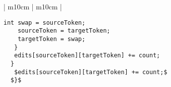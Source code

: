 \begin{landscape}
\begin{table}[p]
\begin{tabular}{ | m{10cm} | m{10cm} | }
{\begin{lstlisting}[style=table]
    int swap = sourceToken;
    sourceToken = targetToken;
    targetToken = swap;
   }
   edits[sourceToken][targetToken] += count;
  }
   $edits[sourceToken][targetToken] += count;$
  $}$
  \end{lstlisting}} \\
  \hline
\end{tabular}
\caption{In this table there are some common mistakes the model sometimes introduces in its output. In the first example the model mixes two lines up because they are very similar. In the second example it manages to reproduce the input sequence correctly but is one-off with one single character. The last example shows how the model sometimes gets stuck in some sort of loop and outputs a part of the input multiple times.}
\label{uncorrupted_showcase_table}
\end{table}


\end{landscape}

